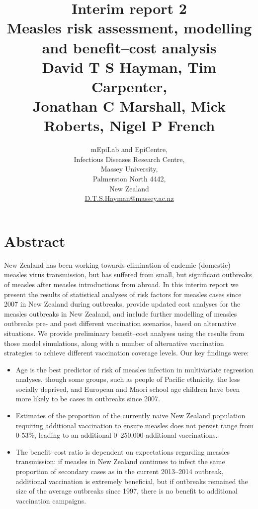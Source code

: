 \documentclass{article}
\begin{document}


\title{Interim report 2\\ Measles risk assessment, modelling and benefit--cost analysis\\ \vspace{2 mm} {\large David T S Hayman, Tim Carpenter,\\ Jonathan C Marshall, Mick Roberts, Nigel P French}}
\author{mEpiLab and EpiCentre,\\ Infectious Diseases Research Centre,\\
Massey University,\\
Palmerston North 4442,\\
New Zealand\\
\href{mailto: D.T.S.Hayman@massey.ac.nz}{D.T.S.Hayman@massey.ac.nz}}  %
\maketitle

\section{Abstract}

New Zealand has been working towards elimination of endemic (domestic) measles virus transmission, but has suffered from small, but significant outbreaks of measles after measles introductions from abroad. In this interim report we present the results of statistical analyses of risk factors for measles cases since 2007 in New Zealand during outbreaks, provide updated cost analyses for the measles outbreaks in New Zealand, and include further modelling of measles outbreaks pre- and post different vaccination scenarios, based on alternative situations. We provide preliminary benefit--cost analyses using the results from those model simulations, along with a number of alternative vaccination strategies to achieve different vaccination coverage levels. Our key findings were:
\begin{itemize}
\item Age is the best predictor of risk of measles infection in multivariate regression analyses, though some groups, such as people of Pacific ethnicity, the less socially deprived, and European and Maori school age children have been more likely to be cases in outbreaks since 2007.
\item Estimates of the proportion of the currently naive New Zealand population requiring additional vaccination to ensure measles does not persist range from 0-53\%, leading to an additional 0--250,000 additional vaccinations.
\item The benefit--cost ratio is dependent on expectations regarding measles transmission: if measles in New Zealand continues to infect the same proportion of secondary cases as in the current 2013--2014 outbreak, additional vaccination is extremely beneficial, but if outbreaks remained the size of the average outbreaks since 1997, there is no benefit to additional vaccination campaigns.
\end{itemize}
\end{document}
